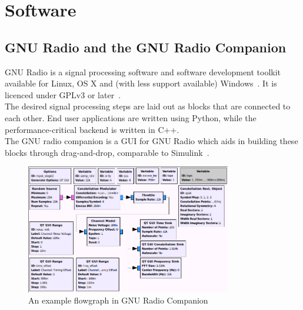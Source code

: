 \documentclass[conference]{IEEEtran}
\begin{document}
\section{Software} %
\subsection{GNU Radio and the GNU Radio Companion}
GNU Radio is a signal processing software and software development toolkit available for Linux, OS X and (with less support available) Windows~\cite{Gnu19FAQ}\cite{Gnu19What}. It is licenced under GPLv3 or later~\cite{Gnu19FAQ}.\\
The desired signal processing steps are laid out as blocks that are connected to each other. End user applications are written using Python, while the performance-critical backend is written in C++.\\
The GNU radio companion is a GUI for GNU Radio which aids in building these blocks through drag-and-drop, comparable to Simulink~\cite{Gnu19FAQ}.\\
\balance
\begin{figure}
	\centering
	\includegraphics[width=0.8\textwidth]{gnuradio_example_flowgraph}
	\caption{An example flowgraph in GNU Radio Companion~\cite{Gnu19Example}}
\end{figure}
\end{document}
